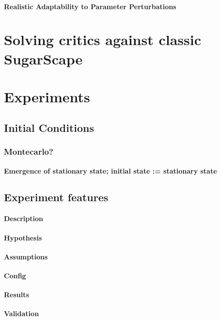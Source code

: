 \documentclass{report}
\begin{document}
		\paragraph{Realistic Adaptability to Parameter Perturbations}
	\section{Solving critics against classic SugarScape}
	\section{Experiments}	
		\subsection{Initial Conditions}
			\subsubsection{Montecarlo?} 
			\paragraph{Emergence of stationary state; initial state := stationary state}
		\subsection{Experiment features}
			\paragraph{Description}
			\paragraph{Hypothesis}
			\paragraph{Assumptions}
			\paragraph{Config}
			\paragraph{Results}
			\paragraph{Validation}
	
\newpage 
\end{document}
